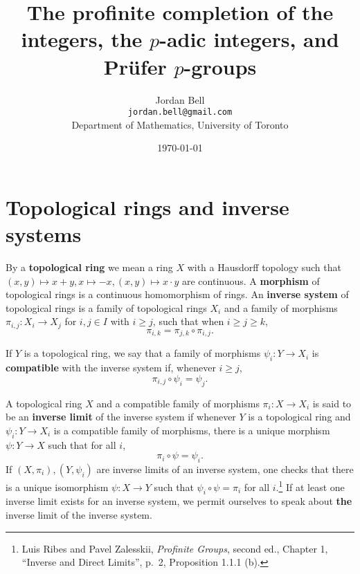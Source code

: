 \documentclass{article}
\theoremstyle{definition}
\begin{document}
\title{The profinite completion of the integers, the $p$-adic integers, and Pr\"ufer $p$-groups}
\author{Jordan Bell\\ \texttt{jordan.bell@gmail.com}\\Department of Mathematics, University of Toronto}
\date{\today}

\maketitle

\section{Topological rings and inverse systems}
By a \textbf{topological ring} we mean a ring $X$ with a Hausdorff topology such that $(x,y) \mapsto x+y, x \mapsto -x, (x,y) \mapsto x\cdot y$ 
are continuous. A \textbf{morphism} of topological rings is a continuous homomorphism of rings. 
An \textbf{inverse system} of topological rings is a family of topological rings
$X_i$ and a family of morphisms $\pi_{i,j}:X_i \to X_j$ for $i,j \in I$ with $i \geq j$, such that when $i \geq j \geq k$,
\[
\pi_{i,k} = \pi_{j,k} \circ \pi_{i,j}.
\]

If $Y$ is a topological ring,
we say that a family of morphisms $\psi_i:Y \to X_i$ is \textbf{compatible} with the inverse system if, whenever $i \geq j$,
\[
\pi_{i,j} \circ \psi_i = \psi_j.
\]

A topological ring $X$ and a compatible family of morphisms $\pi_i:X \to X_i$ is said to be an \textbf{inverse limit} of the inverse system
if whenever $Y$ is a topological ring and $\psi_i:Y \to X_i$ is a compatible family of morphisms, there is a unique 
morphism $\psi:Y \to X$ such that for all $i$,
\[
\pi_i \circ \psi = \psi_i.
\]
If $(X,\pi_i),(Y,\psi_i)$ are inverse limits of an inverse system, 
one checks that there is a unique isomorphism $\psi:X \to Y$ such that $\psi_i \circ \psi = \pi_i$ for all $i$.\footnote{Luis Ribes and Pavel Zalesskii, {\em Profinite Groups}, second ed., Chapter 1, ``Inverse and Direct Limits'', p.~2, Proposition 1.1.1 (b).}
If at least one inverse limit exists for an inverse system,
we
permit ourselves to speak about \textbf{the} inverse limit of the inverse system.
\end{document}
